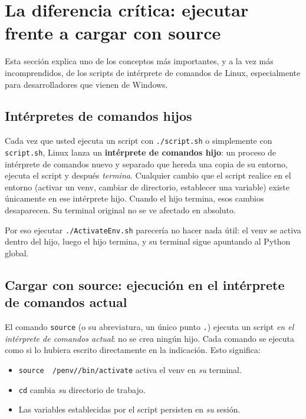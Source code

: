\section{La diferencia crítica: ejecutar frente a cargar con source}
\label{sec:source-vs-execute}

Esta sección explica uno de los conceptos más importantes, y a la vez más
incomprendidos, de los scripts de intérprete de comandos de Linux,
especialmente para desarrolladores que vienen de Windows.

\subsection{Intérpretes de comandos hijos}

Cada vez que usted ejecuta un script con \texttt{./script.sh} o simplemente
con \texttt{script.sh}, Linux lanza un \textbf{intérprete de comandos hijo}:
un proceso de intérprete de comandos nuevo y separado que hereda una copia
de su entorno, ejecuta el script y después \emph{termina}. Cualquier cambio
que el script realice en el entorno (activar un venv, cambiar de
directorio, establecer una variable) existe únicamente en ese intérprete
hijo. Cuando el hijo termina, esos cambios desaparecen. Su terminal
original no se ve afectado en absoluto.

Por eso ejecutar \texttt{./ActivateEnv.sh} parecería no hacer nada útil:
el venv se activa dentro del hijo, luego el hijo termina, y su terminal
sigue apuntando al Python global.

\subsection{Cargar con source: ejecución en el intérprete de comandos actual}

El comando \texttt{source} (o su abreviatura, un único punto \texttt{.})
ejecuta un script \emph{en el intérprete de comandos actual}: no se crea
ningún hijo. Cada comando se ejecuta como si lo hubiera escrito
directamente en la indicación. Esto significa:

\begin{itemize}
  \item \texttt{source ~/penv/\ProjectName{}/bin/activate} activa el venv
        en \emph{su} terminal.
  \item \texttt{cd} cambia \emph{su} directorio de trabajo.
  \item Las variables establecidas por el script persisten en \emph{su} sesión.
\end{itemize}

